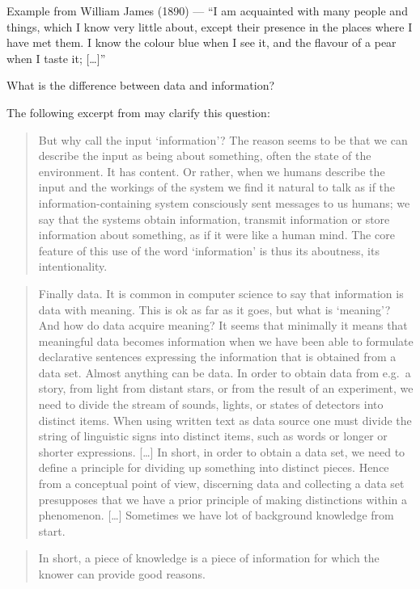 \documentclass[
  12pt,
]{book}
\begin{document}
Example from William James (1890) --- ``I am acquainted with many people and things, which I know very little about, except their presence in the places where I have met them. I know the colour blue when I see it, and the flavour of a pear when I taste it; {[}\ldots{]}''

What is the difference between data and information?

The following excerpt from \citep{johansson2016philosophy} may clarify this question:

\begin{quote}
But why call the input `information'? The reason seems to be that we can describe the input as being about something, often the state of the environment. It has content. Or rather, when we humans describe the input and the workings of the system we find it natural to talk as if the information-containing system consciously sent messages to us humans; we say that the systems obtain information, transmit information or store information about something, as if it were like a human mind. The core feature of this use of the word `information' is thus its aboutness, its intentionality.
\end{quote}

\begin{quote}
Finally data. It is common in computer science to say that information is data with meaning. This is ok as far as it goes, but what is `meaning'? And how do data acquire meaning? It seems that minimally it means that meaningful data becomes information when we have been able to formulate declarative sentences expressing the information that is obtained from a data set. Almost anything can be data. In order to obtain data from e.g.~a story, from light from distant stars, or from the result of an experiment, we need to divide the stream of sounds, lights, or states of detectors into distinct items. When using written text as data source one must divide the string of linguistic signs into distinct items, such as words or longer or shorter expressions. {[}\ldots{]} In short, in order to obtain a data set, we need to define a principle for dividing up something into distinct pieces. Hence from a conceptual point of view, discerning data and collecting a data set presupposes that we have a prior principle of making distinctions within a phenomenon. {[}\ldots{]} Sometimes we have lot of background knowledge from start.
\end{quote}

\begin{quote}
In short, a piece of knowledge is a piece of information for which the knower can provide good reasons.
\end{quote}
\end{document}
